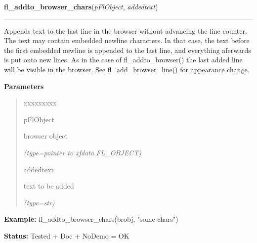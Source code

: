\hspace{.8\funcindent}\begin{boxedminipage}{\funcwidth}

    \raggedright \textbf{fl\_addto\_browser\_chars}(\textit{pFlObject}, \textit{addedtext})

    \vspace{-1.5ex}

    \rule{\textwidth}{0.5\fboxrule}
\setlength{\parskip}{2ex}
    Appends text to the last line in the browser without advancing the line
    counter. The text may contain embedded newline characters. In that 
    case, the text before the first embedded newline is appended to the 
    last line, and everything aferwards is put onto new lines. As in the 
    case of fl\_addto\_browser() the last added line will be visible in the
    browser. See fl\_add\_browser\_line() for appearance change.

\setlength{\parskip}{1ex}
      \textbf{Parameters}
      \vspace{-1ex}

      \begin{quote}
        \begin{Ventry}{xxxxxxxxx}

          \item[pFlObject]

          browser object

            {\it (type=pointer to xfdata.FL\_OBJECT)}

          \item[addedtext]

          text to be added

            {\it (type=str)}

        \end{Ventry}

      \end{quote}

\textbf{Example:} fl\_addto\_browser\_chars(brobj, "some chars")



\textbf{Status:} Tested + Doc + NoDemo = OK



    \end{boxedminipage}

    \label{xformslib:flbrowser:fl_addto_browser_chars}

